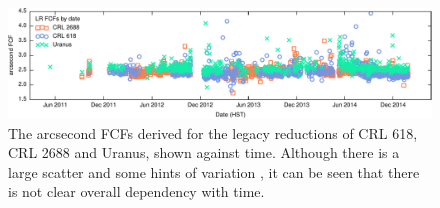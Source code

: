 \documentclass[twocolumn,times]{aastex6}
\begin{document}
\begin{figure}
\includegraphics{legacyFCF-vs-date.pdf}
\caption{The arcsecond FCFs derived for the legacy reductions of CRL
  618, CRL 2688 and Uranus, shown against time. Although there is a
  large scatter and some hints of variation , it can be seen that there is not
  clear overall dependency with time.\label{fig:calibvstime}}
\end{figure}
\end{document}
